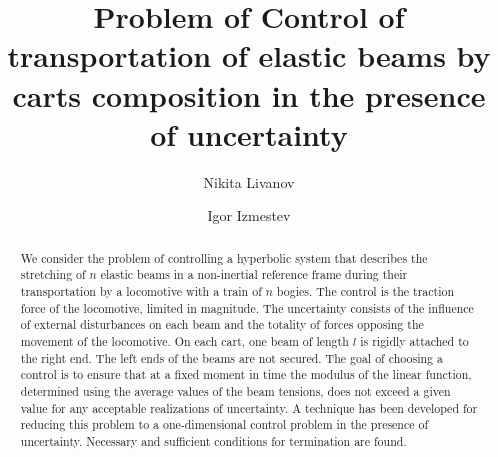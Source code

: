 \begin{englishtitle} %
\title{Problem of Control of transportation of elastic beams by carts composition in the presence of uncertainty}
\author{Nikita Livanov \and  Igor Izmestev
}

\maketitle

\begin{abstract}
We consider the problem of controlling a hyperbolic system that describes the stretching of $n$ elastic beams in a non-inertial reference frame during their transportation by a locomotive with a train of $n$ bogies. The control is the traction force of the locomotive, limited in magnitude. The uncertainty consists of the influence of external disturbances on each beam and the totality of forces opposing the movement of the locomotive. On each cart, one beam of length $l$ is rigidly attached to the right end. The left ends of the beams are not secured. The goal of choosing a control is to ensure that at a fixed moment in time the modulus of the linear function, determined using the average values of the beam tensions, does not exceed a given value for any acceptable realizations of uncertainty. A technique has been developed for reducing this problem to a one-dimensional control problem in the presence of uncertainty. Necessary and sufficient conditions for termination are found.

\end{abstract}
\end{englishtitle}

\iffalse
%
%


\documentclass[12pt]{llncs}  

